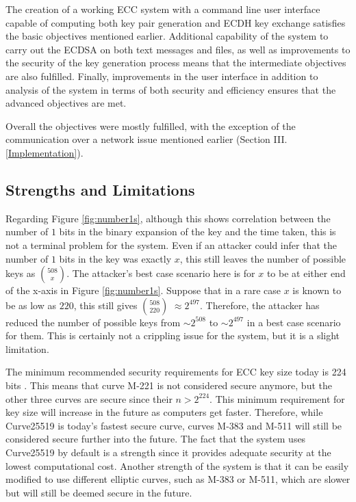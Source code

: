 \documentclass[12pt,a4paper]{article}
\begin{document}
The creation of a working ECC system with a command line user interface capable of computing both key pair generation and ECDH key exchange satisfies the basic objectives mentioned earlier. 
Additional capability of the system to carry out the ECDSA on both text messages and files, 
as well as improvements to the security of the key generation process means that the intermediate objectives are also fulfilled. 
Finally, improvements in the user interface in addition to analysis of the system in terms of both security and efficiency ensures that the advanced objectives are met. 

Overall the objectives were mostly fulfilled, with the exception of the communication over a network issue mentioned earlier (Section III.\ref{Implementation}). 


\subsection{Strengths and Limitations} \noindent \label{Strengths}
Regarding Figure \ref{fig:number1s}, although this shows correlation between the number of $1$ bits in the binary expansion of the key 
and the time taken, this is not a terminal problem for the system. 
Even if an attacker could infer that the number of $1$ bits in the key was exactly $x$, 
this still leaves the number of possible keys as $508 \choose x$. 
The attacker's best case scenario here is for $x$ to be at either end of the x-axis in Figure \ref{fig:number1s}. 
Suppose that in a rare case $x$ is known to be as low as $220$, this still gives $508 \choose 220$ $\approx 2^{497}$. 
Therefore, the attacker has reduced the number of possible keys from $\sim 2^{508}$ to $\sim 2^{497}$ in a best case scenario for them. 
This is certainly not a crippling issue for the system, but it is a slight limitation. 

The minimum recommended security requirements for ECC key size today is 224 bits \cite[p54-55]{barker2020recommendation}. 
This means that curve M-221 is not considered secure anymore, but the other three curves are secure since their $n > 2^{224}$. 
This minimum requirement for key size will increase in the future as computers get faster. 
Therefore, while Curve25519 is today's fastest secure curve, 
curves M-383 and M-511 will still be considered secure further into the future. 
The fact that the system uses Curve25519 by default is a strength since it provides adequate security at the lowest computational cost. 
Another strength of the system is that it can be easily modified to use different elliptic curves, such as M-383 or M-511, which are slower but will still be deemed secure in the future. 
\end{document}

